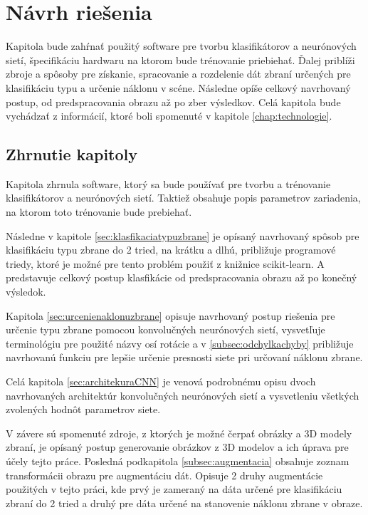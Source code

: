 \chapter{Návrh riešenia}
Kapitola bude zahŕnať použitý software pre tvorbu klasifikátorov a neurónových sietí, špecifikáciu hardwaru na ktorom bude trénovanie priebiehať.
Ďalej priblíži zbroje a spôsoby pre získanie, spracovanie a rozdelenie dát zbraní určených pre klasifikáciu typu a určenie náklonu v scéne.
Následne opíše celkový navrhovaný postup, od predspracovania obrazu až po zber výsledkov.
Celá kapitola bude vychádzať z informácií, ktoré boli spomenuté v kapitole \ref{chap:technologie}.













\section{Zhrnutie kapitoly}

Kapitola zhrnula software, ktorý sa bude používať pre tvorbu a trénovanie klasifikátorov a neurónových sietí.
Taktiež obsahuje popis parametrov zariadenia, na ktorom toto trénovanie bude prebiehať.

Následne v kapitole \ref{sec:klasfikaciatypuzbrane} je opísaný navrhovaný spôsob pre klasifikáciu typu zbrane do 2 tried, na krátku a dlhú, približuje
    programové triedy, ktoré je možné pre tento problém použiť z knižnice scikit-learn.
A predstavuje celkový postup klasfikácie od predspracovania obrazu až po konečný výsledok.

Kapitola \ref{sec:urcenienaklonuzbrane} opisuje navrhovaný postup riešenia pre určenie typu zbrane pomocou konvolučných neurónových sietí,
    vysvetľuje terminológiu pre použité názvy osí rotácie a v \ref{subsec:odchylkachyby} približuje navrhovanú funkciu pre lepšie určenie presnosti siete
    pri určovaní náklonu zbrane.

Celá kapitola \ref{sec:architekuraCNN} je venová podrobnému opisu dvoch navrhovaných architektúr konvolučných neurónových sietí a
    vysvetleniu všetkých zvolených hodnôt parametrov siete.

V závere sú spomenuté zdroje, z ktorých je možné čerpať obrázky a 3D modely zbraní, je opísaný postup generovanie obrázkov z 3D modelov a ich úprava
    pre účely tejto práce.
Posledná podkapitola \ref{subsec:augmentacia} obsahuje zoznam transformácii obrazu pre augmentáciu dát.
Opisuje 2 druhy augmentácie použitých v tejto práci, kde prvý je zameraný na dáta určené pre klasifikáciu zbraní do 2 tried a druhý pre dáta
    určené na stanovenie náklonu zbrane v obraze.
